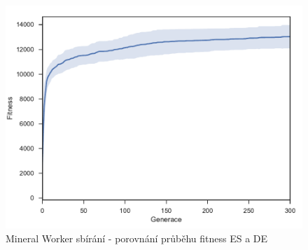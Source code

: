 \begin{figure}[t]\centering
	\includegraphics[width=\columnwidth]{../img/MineralMap/MineralWorkerPickup}
	\caption{Mineral Worker sbírání - porovnání průběhu fitness ES a DE}
	\label{obr04:MineralWorkerPickUp}
\end{figure}
\clearpage

